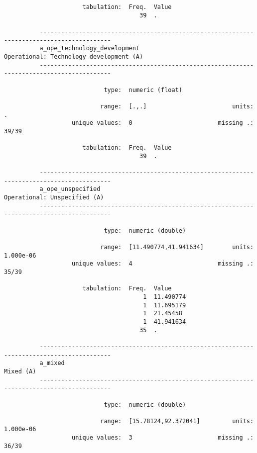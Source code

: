 \documentclass{article}
\begin{document}
\begin{verbatim}
                      tabulation:  Freq.  Value
                                      39  .
          
          ------------------------------------------------------------------------------------------
          a_ope_technology_development                       Operational: Technology development (A)
          ------------------------------------------------------------------------------------------
          
                            type:  numeric (float)
          
                           range:  [.,.]                        units:  .
                   unique values:  0                        missing .:  39/39
          
                      tabulation:  Freq.  Value
                                      39  .
          
          ------------------------------------------------------------------------------------------
          a_ope_unspecified                                             Operational: Unspecified (A)
          ------------------------------------------------------------------------------------------
          
                            type:  numeric (double)
          
                           range:  [11.490774,41.941634]        units:  1.000e-06
                   unique values:  4                        missing .:  35/39
          
                      tabulation:  Freq.  Value
                                       1  11.490774
                                       1  11.695179
                                       1  21.45458
                                       1  41.941634
                                      35  .
          
          ------------------------------------------------------------------------------------------
          a_mixed                                                                          Mixed (A)
          ------------------------------------------------------------------------------------------
          
                            type:  numeric (double)
          
                           range:  [15.78124,92.372041]         units:  1.000e-06
                   unique values:  3                        missing .:  36/39
          

\end{verbatim}
\end{document}
